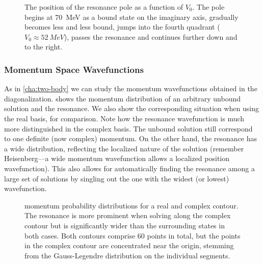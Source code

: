 \documentclass[../main/report.tex]{subfiles}
\begin{document}
\begin{figure}[t]
  \caption{The position of the resonance pole as a function of $V_0$. The pole begins at \SI{70}{MeV} as a bound state on the imaginary axis, gradually becomes less and less bound, jumps into the fourth quadrant ($V_0 \approx \SI{52}{MeV}$), passes the  resonance and continues further down and to the right.}
  \label{fig:pole(V0)}
\end{figure}

\subsubsection{Momentum Space Wavefunctions}

As in \cref{cha:two-body} we can study the momentum wavefunctions obtained in the diagonalization.
 shows the momentum distribution of an arbitrary unbound solution and the resonance. We also show the corresponding situation when using the real basis, for comparison. Note how the resonance wavefunction is much more distinguished in the complex basis.  
The unbound solution still correspond to one definite (now complex) momentum. 
On the other hand, the resonance has a wide distribution, reflecting the localized nature of the solution 
(remember Heisenberg---a wide momentum wavefunction allows a localized position wavefunction). 
This also allows for automatically finding the resonance among a large set of solutions by singling out the one with the widest (or lowest) wavefunction.


\begin{figure}
\caption{ momentum probability distributions for a real and complex contour. The resonance is more prominent when solving along the complex contour but is significantly wider than the surrounding states in both cases. Both contours comprise 60 points in total, but the points in the complex contour are concentrated near the origin, stemming from the Gauss-Legendre distribution on the individual segments.} 
\label{fig:complex_mom_wavefunctions}
\end{figure}
\end{document}
